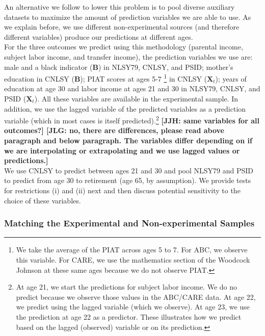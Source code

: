 \noindent An alternative we follow to lower this problem is to pool diverse auxiliary datasets to maximize the amount of prediction variables we are able to use. As we explain before, we use different non-experimental sources (and therefore different variables) produce our predictions at different ages.\\

\noindent For the three outcomes we predict using this methodology (parental income, subject labor income, and transfer income), the prediction variables we use are: male and a black indicator ($\bm{B}$) in NLSY79, CNLSY, and PSID; mother's education in CNLSY ($\bm{B}$); PIAT scores at ages 5-7 \footnote{We take the average of the PIAT across ages 5 to 7. For ABC, we observe this variable. For CARE, we use the mathematics section of the Woodcock Johnson at these same ages because we do not observe PIAT.} in CNLSY ($\bm{X}_{t}$); years of education at age 30 and labor income at ages 21 and 30 in NLSY79, CNLSY, and PSID ($\bm{X}_{t}$). All these variables are available in the experimental sample. In addition, we use the lagged variable of the predicted variables as a prediction variable (which in most cases is itself predicted).\footnote{At age 21, we start the predictions for subject labor income. We do no predict because we observe those values in the ABC/CARE data. At age 22, we predict using the lagged variable (which we observe). At age 23, we use the prediction at age 22 as a predictor. These illustrates how we predict based on the lagged (observed) variable or on its prediction.} \textbf{[JJH: same variables for all outcomes?] [JLG: no, there are differences, please read above paragraph and below paragraph. The variables differ depending on if we are interpolating or extrapolating and we use lagged values or predictions.]}\\

\noindent We use CNLSY to predict between ages 21 and 30 and pool NLSY79 and PSID to predict from age 30 to retirement (age 65, by assumption). We provide tests for restrictions (i) and (ii) next and then discuss potential sensitivity to the choice of these variables.

\subsubsection{Matching the Experimental and Non-experimental Samples} \label{appendix:match}

